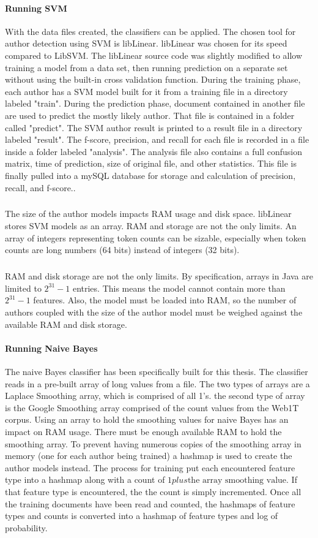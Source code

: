 	\paragraph{Running SVM} With the data files created, the classifiers can be applied. The chosen tool for author detection using SVM is libLinear.  libLinear was chosen for its speed compared to LibSVM.  The libLinear source code was slightly modified to allow training a model from a data set, then running prediction on a separate set without using the built-in cross validation function.  During the training phase, each author has a SVM model built for it from a training file in a directory labeled "train".  During the prediction phase, document contained in another file are used to predict the mostly likely author.  That file is contained in a folder called "predict". The SVM author result is printed to a result file in a directory labeled "result".  The f-score, precision, and recall for each file is recorded in a file inside a folder labeled "analysis".  The analysis file also contains a full confusion matrix, time of prediction, size of original file, and other statistics.  This file is finally pulled into a mySQL database for storage and calculation of precision, recall, and f-score..
	\subparagraph{} The size of the author models impacts RAM usage and disk space.  libLinear stores SVM models as an array. RAM and storage are not the only limits.  An array of integers representing token counts can be sizable, especially when token counts are long numbers (64 bits) instead of integers (32 bits). 
	\subparagraph{} RAM and disk storage are not the only limits. By specification, arrays in Java are limited to $2^{31}-1$ entries.  This means the model cannot contain more than $2^{31}-1$ features.  Also, the model must be loaded into RAM, so the number of authors coupled with the size of the author model must be weighed against the available RAM and disk storage.
	
	\paragraph{Running Naive Bayes} The naive Bayes classifier has been specifically built for this thesis.  The classifier reads in a pre-built array of long values from a file.  The two types of arrays are a Laplace Smoothing array, which is comprised of all 1's.  the second type of array is the Google Smoothing array comprised of the count values from the Web1T corpus.  Using an array to hold the smoothing values for naive Bayes has an impact on RAM usage.  There must be enough available RAM to hold the smoothing array.  To prevent having numerous copies of the smoothing array in memory (one for each author being trained) a hashmap is used to create the author models instead.  The process for training put each encountered feature type into a hashmap along with a count of $1 plus \text{the array smoothing value}$.  If that feature type is encountered, the the count is simply incremented. Once all the training documents have been read and counted, the hashmaps of feature types and counts is converted into a hashmap of feature types and log of probability.
